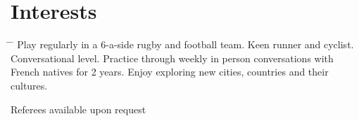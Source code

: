 \documentclass[10pt]{article} %
\begin{document}
\vspace{-5mm}
\section{Interests}

\begin{tabbing}
  \hspace{2mm} \= \hspace{18mm} \= \kill 
     {Play regularly in a 6-a-side rugby and football team. Keen runner and cyclist.}
     {Conversational level. Practice through weekly in person conversations with French natives for 2 years.}
     {Enjoy exploring new cities, countries and their cultures.}
\end{tabbing}

\vspace{-4mm}
Referees available upon request
\end{document}
